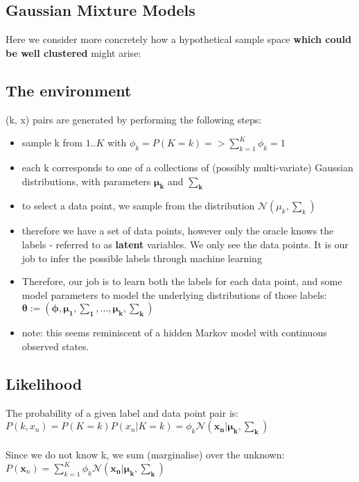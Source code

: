 \documentclass[a4paper]{article}
\begin{document}
	\subsection{Gaussian Mixture Models}
	Here we consider more concretely how a hypothetical sample space \textbf{which could be well clustered} might arise:
	
	\subsection{The environment}
	
	(k, x) pairs are generated by performing the following steps:
	
	\begin{itemize}
		\item sample k from ${1..K}$ with $\phi_k = P(K = k) => \sum_{k=1}^{K}\phi_k = 1$
		\item each k corresponds to one of a collections of (possibly multi-variate) Gaussian distributions, with parameters $\mathbf{\mu_k}$ and $\mathbf{\sum_k}$
		\item to select a data point, we sample from the distribution $\mathcal{N}(\mu_k, \sum_k)$
		\item therefore we have a set of data points, however only the oracle knows the labels - referred to as \textbf{latent} variables. We only see the data points. It is our job to infer the possible labels through machine learning
		\item Therefore, our job is to learn both the labels for each data point, and some model parameters to model the underlying distributions of those labels: $\mathbf{\theta := (\phi, \mu_1, \sum_1, ..., \mu_k, \sum_k)}$
		\item note: this seems reminiscent of a hidden Markov model with continuous observed states.
	\end{itemize}
	
	\subsection{Likelihood}
	The probability of a given label and data point pair is: \\
	$P(k, x_n) = P(K=k)P(x_n | K=k) = \phi_k \mathcal{N}(\mathbf{x_n | \mu_k, \sum_k})$ \\ \\
	Since we do not know k, we sum (marginalise) over the unknown: \\
	$P(\mathbf{x}_n) = \sum_{k=1}^{K}\phi_k \mathcal{N}(\mathbf{x_n| \mu_k, \sum_k})$ \\
	
\end{document}
